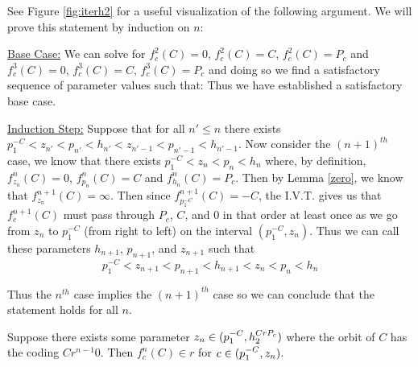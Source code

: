 		\begin{myproof}
			See Figure \ref{fig:iterh2} for a useful visualization of the following argument. We will prove this statement by induction on $n$:

			\underline{Base Case:} We can solve for $f^2_c (C) = 0$, $f^2_c (C) = C$, $f^2_c (C) = P_c$ and $f^3_c (C) = 0$, $f^3_c (C) = C$, $f^3_c (C) = P_c$ and doing so we find a satisfactory sequence of parameter values such that:
			Thus we have established a satisfactory base case.

			\underline{Induction Step:} Suppose that for all $n' \leq n$ there exists $p_1^{-C} < z_{n'} < p_{n'} < h_{n'} < z_{n' - 1} < p_{n' - 1} < h_{n' - 1}$. Now consider the $ (n + 1)^{th}$ case, we know that there exists $p_1^{-C} < z_n < p_n < h_n$ where, by definition, $f^n_{z_n} (C) = 0$, $f^n_{p_n} (C) = C$ and $f^n_{h_n} (C) = P_c$. Then by Lemma \ref{zero}, we know that $f^{n+1}_{z_n} (C) = \infty$. Then since $f^{n+1}_{p_1^{-C}} (C) = -C$, the I.V.T. gives us that $f^{n+1}_{c} (C)$ must pass through $P_c$, $C$, and $0$ in that order at least once as we go from $z_n$ to $p_1^{-C}$ (from right to left) on the interval $ (p_1^{-C}, z_n)$. Thus we can call these parameters $h_{n+1}$, $p_{n+1}$, and $z_{n+1}$ such that 
			\[ p_1^{-C} < z_{n+1} < p_{n+1} < h_{n+1} < z_{n} < p_n < h_n\]

			Thus the $n^{th}$ case implies the $ (n+1)^{th}$ case so we can conclude that the statement holds for all $n$.
		\end{myproof}

		\begin{mylemma} \label{inr}
			Suppose there exists some parameter $z_n \in (p^{-C}_1, h^{CrP_c}_2)$ where the orbit of $C$ has the coding $Cr^{n-1}0$. Then $f^n_c (C) \in r$ for $c\in (p^{-C}_1, z_n)$.
		\end{mylemma}

